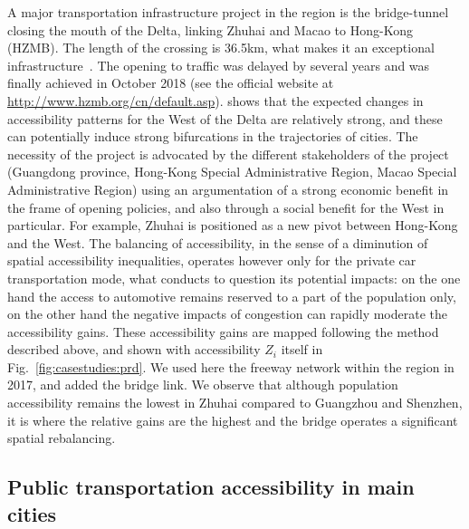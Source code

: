 A major transportation infrastructure project in the region is the bridge-tunnel closing the mouth of the Delta, linking Zhuhai and Macao to Hong-Kong (HZMB). The length of the crossing is 36.5km, what makes it an exceptional infrastructure~\citep{hussain2011hong}. The opening to traffic was delayed by several years and was finally achieved in October 2018 (see the official website at \url{http://www.hzmb.org/cn/default.asp}). \cite{zhou2016medium} shows that the expected changes in accessibility patterns for the West of the Delta are relatively strong, and these can potentially induce strong bifurcations in the trajectories of cities. The necessity of the project is advocated by the different stakeholders of the project (Guangdong province, Hong-Kong Special Administrative Region, Macao Special Administrative Region) using an argumentation of a strong economic benefit in the frame of opening policies, and also through a social benefit for the West in particular. For example, Zhuhai is positioned as a new pivot between Hong-Kong and the West. The balancing of accessibility, in the sense of a diminution of spatial accessibility inequalities, operates however only for the private car transportation mode, what conducts to question its potential impacts: on the one hand the access to automotive remains reserved to a part of the population only, on the other hand the negative impacts of congestion can rapidly moderate the accessibility gains. These accessibility gains are mapped following the method described above, and shown with accessibility $Z_i$ itself in Fig.~\ref{fig:casestudies:prd}. We used here the freeway network within the region in 2017, and added the bridge link. We observe that although population accessibility remains the lowest in Zhuhai compared to Guangzhou and Shenzhen, it is where the relative gains are the highest and the bridge operates a significant spatial rebalancing.






\subsection{Public transportation accessibility in main cities}

